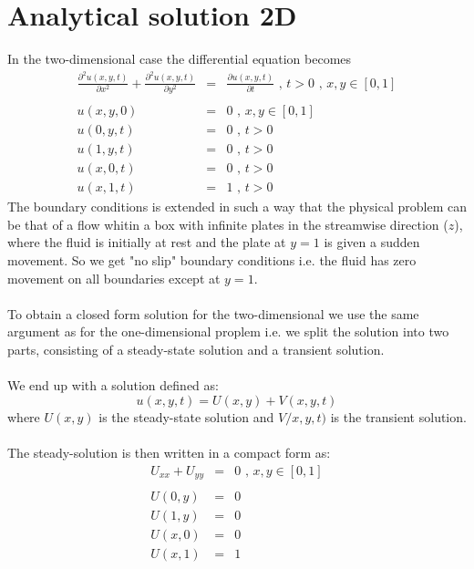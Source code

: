 \documentclass{article}
\begin{document}
\section*{Analytical solution 2D}
In the two-dimensional case the differential equation becomes
\begin{subequations}
\begin{eqnarray}
\frac{\partial^2 u(x,y,t)}{\partial x^2} + \frac{\partial^2 u(x,y,t)}{\partial y^2} &=&  \frac{\partial u(x,y,t)}{\partial t} \textit{ , } t>0 \textit{ , } x,y \in [0,1] \\ \nonumber \\
u(x,y,0) &=& 0 \textit{ , } x,y \in [0,1] \\ 
u(0,y,t) &=& 0 \textit{ , } t> 0 \\
u(1,y,t) &=& 0 \textit{ , } t> 0 \\
u(x,0,t) &=& 0 \textit{ , } t> 0  \\
u(x,1,t) &=& 1 \textit{ , } t> 0 
\end{eqnarray}
\end{subequations}
The boundary conditions is extended in such a way that the physical problem can be that of a flow whitin a box with infinite plates in the streamwise direction ($z$), where the fluid is initially at rest and the plate at $y=1$ is given a sudden movement. So we get "no slip" boundary conditions i.e. the fluid has zero movement on all boundaries except at $y=1$.
\\
\\
To obtain a closed form solution for the two-dimensional we use the same argument as for the one-dimensional proplem i.e. we split the solution into two parts, consisting of a steady-state solution and a transient solution.\\
\\
We end up with a solution defined as:
\begin{equation}
u(x,y,t) = U(x,y) + V(x,y,t)
\end{equation}
where $U(x,y)$ is the steady-state solution and $V/x,y,t)$ is the transient solution.\\
\\
The steady-solution is then written in a compact form as:
\begin{subequations}
\begin{eqnarray}
U_{xx} + U_{yy} &=& 0 \textit{ , } x,y \in [0,1]\\ \nonumber
\\
U(0,y) &=& 0 \textit{  } \\
U(1,y) &=& 0 \textit{  } \\
U(x,0) &=& 0 \textit{  } \\
U(x,1) &=& 1 \textit{  } 
\end{eqnarray}
\end{subequations}
\end{document}

